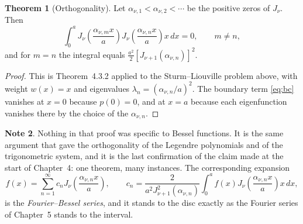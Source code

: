 \documentclass[12pt,a4paper]{report}
\theoremstyle{definition}
\newtheorem{thm}{Theorem}[section]
\newtheorem{note}[thm]{Note}
\theoremstyle{plain}
\begin{document}
\begin{thm}[Orthogonality]
\label{thm:besselorth}
Let $\alpha_{\nu,1}<\alpha_{\nu,2}<\cdots$ be the positive zeros of $J_{\nu}$.
Then
$$\int^{a}_{0}J_{\nu}\!\left(\frac{\alpha_{\nu,m}x}{a}\right)
J_{\nu}\!\left(\frac{\alpha_{\nu,n}x}{a}\right)x\,dx = 0,
\qquad m\neq n,$$
and for $m=n$ the integral equals
$\tfrac{a^{2}}{2}\left[J_{\nu+1}(\alpha_{\nu,n})\right]^{2}$.
\end{thm}

\begin{proof}
This is Theorem~4.3.2 applied to the Sturm--Liouville problem above, with weight
$w(x)=x$ and eigenvalues $\lambda_n = \left(\alpha_{\nu,n}/a\right)^{2}$. The
boundary term \eqref{eq:bc} vanishes at $x=0$ because $p(0)=0$, and at $x=a$
because each eigenfunction vanishes there by the choice of the
$\alpha_{\nu,n}$.
\end{proof}

\begin{note}
Nothing in that proof was specific to Bessel functions. It is the same argument
that gave the orthogonality of the Legendre polynomials and of the
trigonometric system, and it is the last confirmation of the claim made at the
start of Chapter~4: one theorem, many instances. The corresponding expansion
$$f(x) = \sum^{\infty}_{n=1}c_n J_{\nu}\!\left(\frac{\alpha_{\nu,n}x}{a}\right),
\qquad
c_n = \frac{2}{a^{2}J_{\nu+1}^{2}(\alpha_{\nu,n})}
\int^{a}_{0}f(x)J_{\nu}\!\left(\frac{\alpha_{\nu,n}x}{a}\right)x\,dx,$$
is the \emph{Fourier--Bessel series}, and it stands to the disc exactly as the
Fourier series of Chapter~5 stands to the interval.
\end{note}
\end{document}
